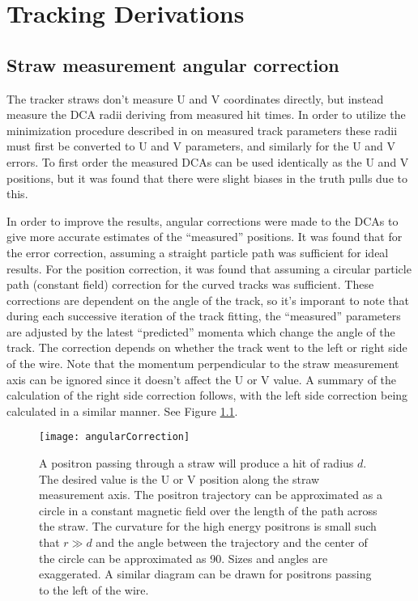 
\thispagestyle{myheadings}

\graphicspath{{Body/Figures/TrackingFigures/CoordSys/}}

\chapter{Tracking Derivations}

\section{Straw measurement angular correction}
\label{app:angularcorrection}


The tracker straws don't measure U and V coordinates directly, but instead measure the DCA radii deriving from measured hit times. In order to utilize the minimization procedure described in  on measured track parameters these radii must first be converted to U and V parameters, and similarly for the U and V errors. To first order the measured DCAs can be used identically as the U and V positions, but it was found that there were slight biases in the truth pulls due to this.

In order to improve the results, angular corrections were made to the DCAs to give more accurate estimates of the ``measured'' positions. It was found that for the error correction, assuming a straight particle path was sufficient for ideal results. For the position correction, it was found that assuming a circular particle path (constant field) correction for the curved tracks was sufficient. These corrections are dependent on the angle of the track, so it's imporant to note that during each successive iteration of the track fitting, the ``measured'' parameters are adjusted by the latest ``predicted'' momenta which change the angle of the track. The correction depends on whether the track went to the left or right side of the wire. Note that the momentum perpendicular to the straw measurement axis can be ignored since it doesn't affect the U or V value. A summary of the calculation of the right side correction follows, with the left side correction being calculated in a similar manner. See Figure \ref{fig:angularCorrection}. 

\begin{figure}
	\centering
	\texttt{[image: angularCorrection]}
	\caption[Angular correction for measured DCAs]{A positron passing through a straw will produce a hit of radius $d$. The desired value is the U or V position along the straw measurement axis. The positron trajectory can be approximated as a circle in a constant magnetic field over the length of the path across the straw. The curvature for the high energy positrons is small such that $r \gg d$ and the angle between the trajectory and the center of the circle can be approximated as 90\textdegree{}. Sizes and angles are exaggerated. A similar diagram can be drawn for positrons passing to the left of the wire.}
	\label{fig:angularCorrection}
\end{figure}

